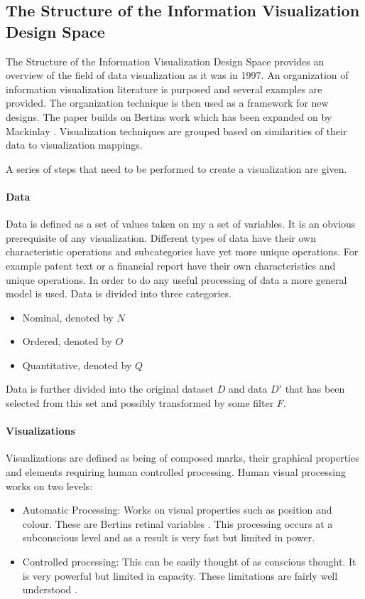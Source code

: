 \documentclass[a4paper, 11pt, titlepage, onehalfspacing]{report}
\begin{document}
		\subsection{The Structure of the Information Visualization Design Space}

The Structure of the Information Visualization Design Space provides an overview of the field of data visualization as it was in 1997. An organization of information visualization literature is purposed and several examples are provided. The organization technique is then used as a framework for new designs. The paper builds on Bertins work \cite{bertin1973semiologie} which has been expanded on by Mackinlay \cite{mackinlay1986automating}. Visualization techniques are grouped based on similarities of their data to visualization mappings.

A series of steps that need to be performed to create a visualization are given. 

\paragraph{Data}
Data is defined as a set of values taken on my a set of variables. It is an obvious prerequisite of any visualization. Different types of data have their own characteristic operations and subcategories have yet more unique operations. For example patent text or a financial report have their own characteristics and unique operations. In order to do any useful processing of data a more general model is used. Data is divided into three categories.
\begin{itemize}
\item Nominal, denoted by $N$
\item Ordered, denoted by $O$
\item Quantitative, denoted by $Q$
\end{itemize}
Data is further divided into the original dataset $D$ and data $D'$ that has been selected from this set and possibly transformed by some filter $F$.

\paragraph{Visualizations}
Visualizations are defined as being of composed marks, their graphical properties and elements requiring human controlled processing. Human visual processing works on two levels:
\begin{itemize}
\item Automatic Processing: Works on visual properties such as position and colour. These are Bertins retinal variables \cite{bertin1973semiologie}. This processing occurs at a subconscious level and as a result is very fast but limited in power.
\item Controlled processing: This can be easily thought of as conscious thought. It is very powerful but limited in capacity. These limitations are fairly well understood \cite{Mil56}.
\end{itemize}
\end{document}
